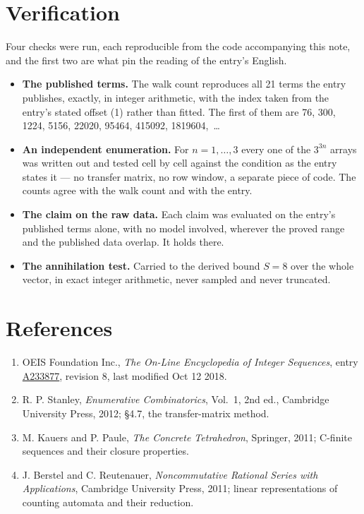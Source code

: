 \documentclass[11pt]{article}
\theoremstyle{definition}
\begin{document}
\section{Verification}

Four checks were run, each reproducible from the code accompanying this note, and the first two are what pin the reading of the entry's English.

\begin{itemize}

\item {\bfseries The published terms.} The walk count reproduces all 21 terms the entry publishes, exactly, in integer arithmetic, with the index taken from the entry's stated offset (1) rather than fitted. The first of them are 76, 300, 1224, 5156, 22020, 95464, 415092, 1819604,~\dots

\item {\bfseries An independent enumeration.} For $n = 1,\dots,3$ every one of the $3^{3n}$ arrays was written out and tested cell by cell against the condition as the entry states it --- no transfer matrix, no row window, a separate piece of code. The counts agree with the walk count and with the entry.

\item {\bfseries The claim on the raw data.} Each claim was evaluated on the entry's published terms alone, with no model involved, wherever the proved range and the published data overlap. It holds there.

\item {\bfseries The annihilation test.} Carried to the derived bound $S = 8$ over the whole vector, in exact integer arithmetic, never sampled and never truncated.

\end{itemize}

\section{References}

\begin{enumerate}

\item OEIS Foundation Inc., \emph{The On-Line Encyclopedia of Integer Sequences}, entry \href{https://oeis.org/A233877}{A233877}, revision 8, last modified Oct 12 2018.

\item R. P. Stanley, \emph{Enumerative Combinatorics}, Vol.~1, 2nd ed., Cambridge University Press, 2012; \S4.7, the transfer-matrix method.

\item M. Kauers and P. Paule, \emph{The Concrete Tetrahedron}, Springer, 2011; C-finite sequences and their closure properties.

\item J. Berstel and C. Reutenauer, \emph{Noncommutative Rational Series with Applications}, Cambridge University Press, 2011; linear representations of counting automata and their reduction.

\end{enumerate}
\end{document}
